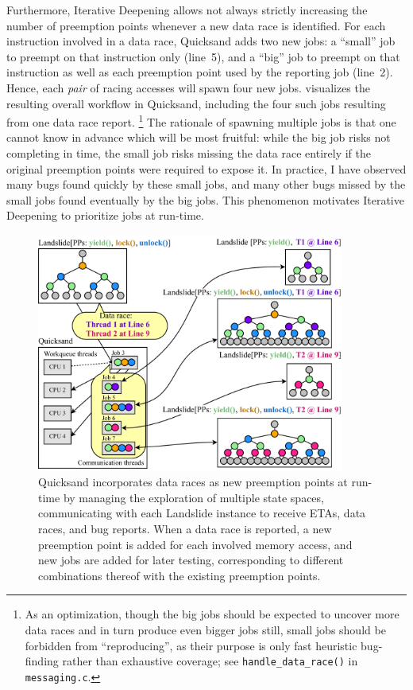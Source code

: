 Furthermore,
Iterative Deepening allows not always strictly increasing the number of preemption points
whenever a new data race is identified.
For each instruction involved in a data race, Quicksand adds two new jobs:
a ``small'' job to preempt on that instruction only (line~5),
and a ``big'' job to preempt on that instruction as well as each preemption point used by the reporting job (line~2).
%
Hence,
each {\em pair} of racing accesses will spawn four new jobs.
 visualizes the resulting overall workflow in Quicksand,
including the four such jobs resulting from one data race report.%
\footnote{As an optimization,
though the big jobs should be expected to uncover more data races and in turn
produce even bigger jobs still,
small jobs should be forbidden from ``reproducing'',
as their purpose is only fast heuristic bug-finding rather than exhaustive coverage;
see {\tt handle\_data\_race()} in {\tt messaging.c}.}
%
The rationale of spawning multiple jobs is that one cannot know in advance which will be most fruitful:
while the big job risks not completing in time,
the small job risks missing the data race entirely if the original preemption points were required to expose it.
In practice, I have observed many bugs found quickly by these small jobs,
and many other bugs missed by the small jobs found eventually by the big jobs.
This phenomenon motivates Iterative Deepening to prioritize jobs at run-time.

\begin{figure}[t]
	\begin{center}
        \includegraphics[width=0.9\textwidth]{dr-jobs-v2.pdf}
	\end{center}
	\caption[Quicksand incorporates data races as new preemption points at run-time.]
		{Quicksand incorporates data races as new preemption points at run-time
		by managing the exploration of multiple state spaces,
		communicating with each Landslide instance to receive ETAs, data races, and bug reports.
                When a data race is reported,
                a new preemption point is added for each involved memory access,
                and new jobs are added for later testing,
                corresponding to different combinations thereof with the existing preemption points.}
        \label{fig:new-dr-jobs}
\end{figure}

